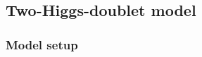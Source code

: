 


\subsection{Two-Higgs-doublet model}
\label{sec:appendix_models_2hdm}

\subsubsection{Model setup}
 
